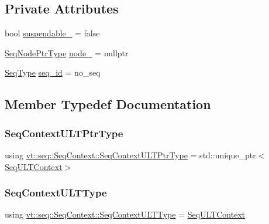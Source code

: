 \subsection*{Private Attributes}
\begin{DoxyCompactItemize}
\item 
bool \hyperlink{structvt_1_1seq_1_1_seq_context_ab540af3ff9d1a7fa6545f7bbaa5c498f}{suspendable\+\_\+} = false
\item 
\hyperlink{namespacevt_1_1seq_ae6a4874b585be0612aaca32ca6d2d191}{Seq\+Node\+Ptr\+Type} \hyperlink{structvt_1_1seq_1_1_seq_context_aa7febe42cc1a7f0866766a4f0f809852}{node\+\_\+} = nullptr
\item 
\hyperlink{namespacevt_1_1seq_a3b612da217ac669d39c159f134ab8434}{Seq\+Type} \hyperlink{structvt_1_1seq_1_1_seq_context_a95feef8d4a4c2622eeebacf3c93892e3}{seq\+\_\+id} = no\+\_\+seq
\end{DoxyCompactItemize}


\subsection{Member Typedef Documentation}
\mbox{\label{structvt_1_1seq_1_1_seq_context_a7e5dc3958df8473c5bcd938f0f2cf933}} 
\subsubsection{\texorpdfstring{Seq\+Context\+U\+L\+T\+Ptr\+Type}{SeqContextULTPtrType}}
{\footnotesize\ttfamily using \hyperlink{structvt_1_1seq_1_1_seq_context_a7e5dc3958df8473c5bcd938f0f2cf933}{vt\+::seq\+::\+Seq\+Context\+::\+Seq\+Context\+U\+L\+T\+Ptr\+Type} =  std\+::unique\+\_\+ptr$<$\hyperlink{structvt_1_1seq_1_1_seq_u_l_t_context}{Seq\+U\+L\+T\+Context}$>$}

\mbox{\label{structvt_1_1seq_1_1_seq_context_a9a865b72336ccccc5baf61f0b748ee56}} 
\subsubsection{\texorpdfstring{Seq\+Context\+U\+L\+T\+Type}{SeqContextULTType}}
{\footnotesize\ttfamily using \hyperlink{structvt_1_1seq_1_1_seq_context_a9a865b72336ccccc5baf61f0b748ee56}{vt\+::seq\+::\+Seq\+Context\+::\+Seq\+Context\+U\+L\+T\+Type} =  \hyperlink{structvt_1_1seq_1_1_seq_u_l_t_context}{Seq\+U\+L\+T\+Context}}



